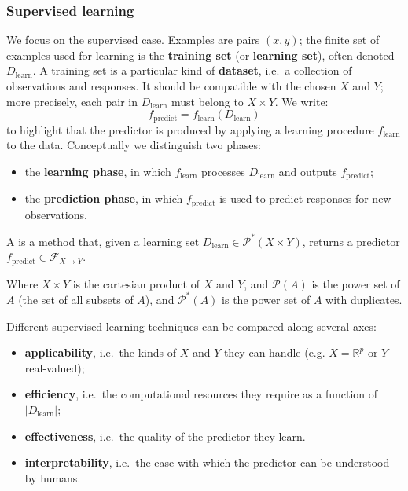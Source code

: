 \vspace{-0.3em}

\subsubsection{Supervised learning}

We focus on the supervised case. Examples are pairs $(x,y)$; the finite set of examples used for learning is the \textbf{training set} (or \textbf{learning set}), often denoted $D_{\text{learn}}$. A training set is a particular kind of \textbf{dataset}, i.e.\ a collection of observations and responses. It should be compatible with the chosen $X$ and $Y$; more precisely, each pair in $D_{\text{learn}}$ must belong to $X \times Y$. 
We write:
$$
f_{\text{predict}} = f_{\text{learn}}(D_{\text{learn}})
$$
to highlight that the predictor is produced by applying a learning procedure $f_{\text{learn}}$ to the data. Conceptually we distinguish two phases:
\begin{itemize}
  \item the \textbf{learning phase}, in which $f_{\text{learn}}$ processes $D_{\text{learn}}$ and outputs $f_{\text{predict}}$;
  \item the \textbf{prediction phase}, in which $f_{\text{predict}}$ is used to predict responses for new observations.
\end{itemize}

\begin{definitionblock}
A  is a method that, given a learning set $D_{\text{learn}} \in \mathcal{P}^{*}(X \times Y)$, returns a predictor $f_{\text{predict}} \in \mathcal{F}_{X \to Y}$.
\end{definitionblock}

Where $X \times Y$ is the cartesian product of $X$ and $Y$, and $\mathcal{P}(A)$ is the power set of $A$ (the set of all subsets of $A$), and $\mathcal{P}^{*}(A)$ is the power set of $A$ with duplicates.

Different supervised learning techniques can be compared along several axes:
\begin{itemize}
  \item \textbf{applicability}, i.e.\ the kinds of $X$ and $Y$ they can handle (e.g. $X = \mathbb{R}^{p}$ or $Y$ real-valued);
  \item \textbf{efficiency}, i.e.\ the computational resources they require as a function of $|D_{\text{learn}}|$;
  \item \textbf{effectiveness}, i.e.\ the quality of the predictor they learn.
  \item \textbf{interpretability}, i.e.\ the ease with which the predictor can be understood by humans.
\end{itemize}


